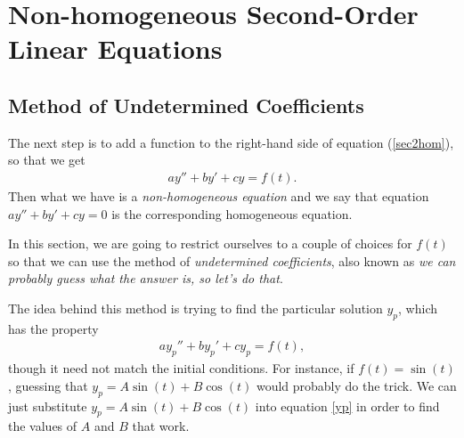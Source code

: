 \documentclass{book}
\begin{document}
\chapter{Non-homogeneous Second-Order Linear Equations}

\section{Method of Undetermined Coefficients}
The next step is to add a function to the right-hand side of equation
(\ref{sec2hom}), so that we get
\begin{align*}
a y'' + b y' + cy =f(t).
\end{align*}
Then what we have is a \emph{non-homogeneous equation} and we say that equation
$a y'' + b y' + cy =0$ is the corresponding homogeneous equation.

In this section, we are going to restrict ourselves to a couple of choices
for $f(t)$ so that we can use the method of \emph{undetermined coefficients},
also known as \emph{we can probably guess what the answer is, so let's do
that}.

The idea behind this method is trying to find the particular solution $y_p$,
which has the property
\begin{align}\label{yp}
a y_p'' + b y_p' + cy_p =f(t),
\end{align}
though it need not match the initial conditions. For instance, if
$f(t)=\sin(t)$, guessing that $y_p = A \sin(t) + B \cos(t)$ would probably do
the trick. We can just substitute $y_p = A \sin(t) + B \cos(t)$ into equation
\eqref{yp} in order to find the values of $A$ and $B$ that work.
\end{document}
